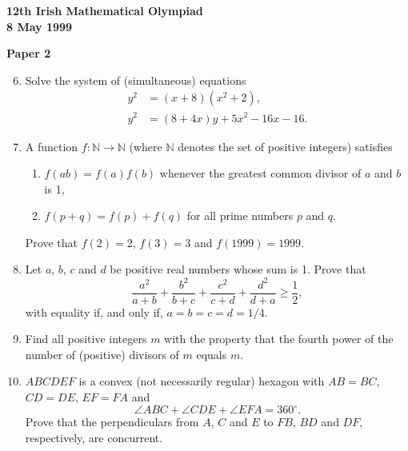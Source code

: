 \documentclass[12pt]{article}
\begin{document}
\newpage
\begin{center}
{\large\bfseries 12th Irish Mathematical Olympiad\\8 May 1999}
\end{center}
\bigskip\noindent\textbf{Paper 2}\bigskip
\begin{enumerate}
\setcounter{enumi}{5}
\item Solve the system of (simultaneous) equations
\begin{align*}
y^2 &= (x+8)(x^2+2),\\
y^2 &= (8+4x)y + 5x^2 - 16x - 16.
\end{align*}

\item A function $f : \mathbb{N} \to \mathbb{N}$ (where $\mathbb{N}$ denotes the set of positive integers) satisfies
\begin{enumerate}
\item[(a)] $f(ab) = f(a)f(b)$ whenever the greatest common divisor of $a$ and $b$ is 1,
\item[(b)] $f(p + q) = f(p) + f(q)$ for all prime numbers $p$ and $q$.
\end{enumerate}
Prove that $f(2) = 2$, $f(3) = 3$ and $f(1999) = 1999$.

\item Let $a$, $b$, $c$ and $d$ be positive real numbers whose sum is 1. Prove that
\[
\frac{a^2}{a+b} + \frac{b^2}{b+c} + \frac{c^2}{c+d} + \frac{d^2}{d+a} \geq \frac{1}{2},
\]
with equality if, and only if, $a = b = c = d = 1/4$.

\item Find all positive integers $m$ with the property that the fourth power of the number of (positive) divisors of $m$ equals $m$.

\item $ABCDEF$ is a convex (not necessarily regular) hexagon with $AB = BC$, $CD = DE$, $EF = FA$ and
\[
\angle ABC + \angle CDE + \angle EFA = 360^\circ.
\]
Prove that the perpendiculars from $A$, $C$ and $E$ to $FB$, $BD$ and $DF$, respectively, are concurrent.

\end{enumerate}
\end{document}
